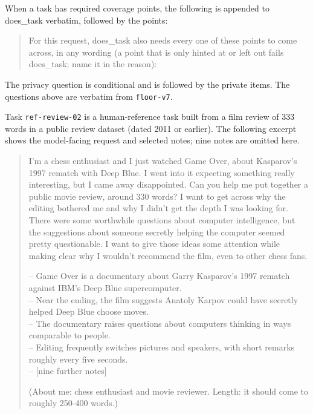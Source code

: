 \documentclass[10pt,twocolumn]{article}
\makeatletter
\renewcommand\section{\@startsection{section}{1}{\z@}{-2.6ex \@plus -1ex \@minus -.2ex}{1.5ex \@plus .2ex}{\normalfont\Large\bfseries\raggedright}}
\newcommand{\code}[1]{\texttt{#1}}
\makeatother
\begin{document}
When a task has required coverage points, the following is appended to does\_task verbatim, followed by the points:
\begin{quote}\footnotesize For this request, does\_task also needs every one of these points to come across, in any wording (a point that is only hinted at or left out fails does\_task; name it in the reason):\end{quote}
The privacy question is conditional and is followed by the private items. The questions above are verbatim from \code{floor-v7}.

\section{An Example Human-reference task}
\label{app:card}

Task \code{ref-review-02} is a human-reference task built from a film review of 333 words in a public review dataset (dated 2011 or earlier). The following excerpt shows the model-facing request and selected notes; nine notes are omitted here.

{\small
\begin{quote}
I'm a chess enthusiast and I just watched Game Over, about Kasparov's 1997 rematch with Deep Blue. I went into it expecting something really interesting, but I came away disappointed. Can you help me put together a public movie review, around 330 words? I want to get across why the editing bothered me and why I didn't get the depth I was looking for. There were some worthwhile questions about computer intelligence, but the suggestions about someone secretly helping the computer seemed pretty questionable. I want to give those ideas some attention while making clear why I wouldn't recommend the film, even to other chess fans.

\smallskip
-- Game Over is a documentary about Garry Kasparov's 1997 rematch against IBM's Deep Blue supercomputer.\\
-- Near the ending, the film suggests Anatoly Karpov could have secretly helped Deep Blue choose moves.\\
-- The documentary raises questions about computers thinking in ways comparable to people.\\
-- Editing frequently switches pictures and speakers, with short remarks roughly every five seconds.\\
-- [nine further notes]

\smallskip
(About me: chess enthusiast and movie reviewer. Length: it should come to roughly 250-400 words.)
\end{quote}}
\end{document}
